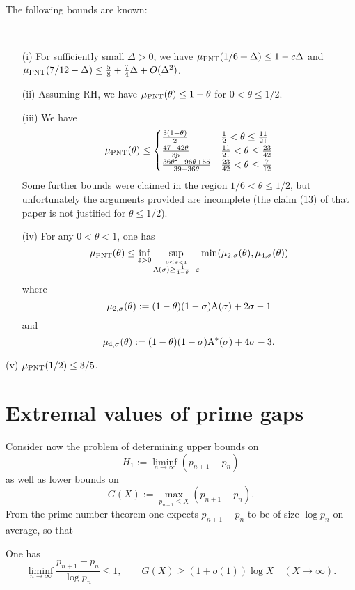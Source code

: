 The following bounds are known:

\begin{lemma}[Bounds on $\mu$]\label{baz-bound}\
  \begin{itemize}
  \item[(i)]  \cite[Theorem 2(i)]{bazzanella-perelli}  For sufficiently small $\Delta>0$, we have $\mu_{\mathrm{PNT}}(1/6 + \Delta) \leq 1 - c\Delta$ and $\mu_{\mathrm{PNT}}(7/12-\Delta) \leq \frac{5}{8} + \frac{7}{4}\Delta + O(\Delta^2)$.
  \item[(ii)] \cite[Theorem 2(ii)]{bazzanella-perelli} Assuming RH, we have $\mu_{\mathrm{PNT}}(\theta) \leq 1-\theta$ for $0 < \theta \leq 1/2$.
    \item[(iii)] \cite[Lemma 1]{bazzanella} We have
  $$
  \mu_{\mathrm{PNT}}(\theta) \leq
  \begin{cases}
  \frac{3(1-\theta)}{2} & \frac{1}{2} < \theta \leq \frac{11}{21} \\
  \frac{47-42\theta}{35}& \frac{11}{21} < \theta \leq \frac{23}{42} \\
  \frac{36\theta^2-96\theta+55}{39-36\theta} & \frac{23}{42} < \theta \leq \frac{7}{12} \\
  \end{cases}
  $$
  Some further bounds were claimed in the region $1/6 < \theta \leq 1/2$, but unfortunately the arguments provided are incomplete (the claim (13) of that paper is not justified for $\theta \leq 1/2$).
  \item[(iv)] \cite{gafni-tao} For any $0 < \theta < 1$, one has
$$\mu_{\mathrm{PNT}}(\theta) \leq \inf_{\varepsilon>0} \sup_{\stackrel{0 \leq \sigma < 1}{\mathrm{A}(\sigma) \geq \frac{1}{1-\theta}-\varepsilon}} \min(\mu_{2,\sigma}(\theta), \mu_{4,\sigma}(\theta))$$
where
$$ \mu_{2,\sigma}(\theta) := (1-\theta)(1-\sigma) \mathrm{A}(\sigma) + 2\sigma - 1$$
and
$$ \mu_{4,\sigma}(\theta) := (1-\theta)(1-\sigma) \mathrm{A}^*(\sigma) + 4\sigma-3.$$
  \end{itemize}
  \item[(v)] \cite[Theorem 2]{heath-brown_differences_2021} $\mu_{\mathrm{PNT}}(1/2) \leq 3/5$.
\end{lemma}




\section{Extremal values of prime gaps}

Consider now the problem of determining upper bounds on
\begin{equation}\label{eqn:small-prime-gaps}
H_1 := \liminf_{n\to\infty}(p_{n + 1} - p_n)
\end{equation}
as well as lower bounds on
\begin{equation}\label{eqn:large-prime-gaps}
G(X) := \max_{p_{n + 1} \le X}(p_{n + 1} - p_n).
\end{equation}
From the prime number theorem one expects $p_{n + 1} - p_n$ to be of size $\log p_n$ on average, so that
\begin{theorem}
One has
\[
\liminf_{n\to\infty}\frac{p_{n + 1} - p_n}{\log p_n} \le 1,\qquad G(X) \ge (1 + o(1)) \log X\quad (X \to \infty).
\]
\end{theorem}

